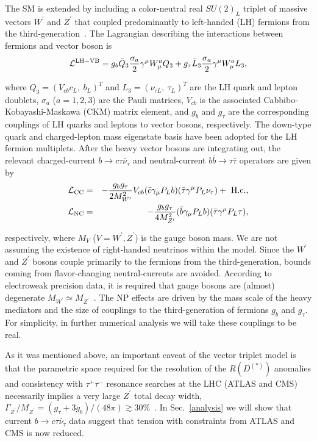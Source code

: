 \documentclass[reprint,showpacs,aps,prd,nofootinbib,superscriptaddress,longbibliography]{revtex4-1}
\begin{document}
The SM is extended by including a color-neutral real $SU(2)_L$ triplet of massive vectors $W^\prime$ and $Z^\prime$ that coupled predominantly to left-handed (LH) fermions from the third-generation~\cite{Greljo:2015mma,Faroughy:2016osc}. The Lagrangian describing the interactions between fermions and vector boson is~\cite{Greljo:2015mma,Faroughy:2016osc} 
\begin{equation}
 \mathcal{L}^{\rm LH-VB} =  g_b \bar{Q}_{3}\frac{\sigma_a}{2} \gamma^\mu W^a_\mu Q_{3} + g_\tau \bar{L}_{3} \frac{\sigma_a}{2} \gamma^\mu W^a_\mu L_{3},
 \end{equation}

\noindent where $Q_{3}= (V_{cb}c_L, \ b_L)^T$ and $L_{3}= (\nu_{\tau L}, \ \tau_L)^T$ are the LH quark and lepton doublets, $\sigma_a$ ($a=1,2,3$) are the Pauli matrices, $V_{cb}$ is the associated Cabbibo-Kobayashi-Maskawa (CKM) matrix element, and $g_b$ and $g_\tau$ are the corresponding couplings of LH quarks and leptons to vector bosons, respectively. The down-type quark and charged-lepton mass eigenstate basis have been adopted for the LH fermion multiplets. After the heavy vector bosons are integrating out, the relevant charged-current $b\to c\tau\bar{\nu}_\tau$ and neutral-current $b \bar{b}\to \tau\bar{\tau}$ operators are given by~\cite{Greljo:2015mma}
\begin{eqnarray}
 \mathcal{L}_{\rm CC} &=& -\frac{g_b g_\tau}{2 M^2_{W^\prime}} V_{cb} (\bar{c} \gamma_\mu P_L b) (\bar{\tau} \gamma^\mu P_L \nu_{\tau}) + \ {\rm H.c.},  \\
  \mathcal{L}_{\rm NC} &=& -\frac{g_b g_\tau}{4 M^2_{Z^\prime}} (\bar{b} \gamma_\mu P_L b) (\bar{\tau} \gamma^\mu P_L \tau), 
\end{eqnarray}

\noindent respectively, where $M_{V}$ ($V=W^\prime,Z^\prime$) is the gauge boson mass. We are not assuming the existence of right-handed neutrinos within the model. Since the $W^\prime$ and $Z^\prime$ bosons couple primarily to the fermions from the third-generation, bounds coming from flavor-changing neutral-currents are avoided. According to electroweak precision data, it is required that gauge bosons are (almost) degenerate $M_{W^\prime} \simeq M_{Z^\prime}$~\cite{Faroughy:2016osc}. The NP effects are driven by the mass scale of the heavy mediators and the size of couplings to the third-generation of fermions $g_b$ and $g_\tau$. For simplicity, in further numerical analysis we will take these couplings to be real.

As it was mentioned above, an important caveat of the vector triplet model is that the parametric space required for the resolution of the $R(D^{(\ast)})$ anomalies and consistency with $\tau^+\tau^-$ resonance searches at the LHC (ATLAS and CMS) necessarily implies a very large $Z^\prime$ total decay width, $\Gamma_{Z^\prime} / M_{Z^\prime} = (g_\tau + 3g_b)/(48\pi) \gtrsim 30 \%$~\cite{Greljo:2015mma,Faroughy:2016osc}.  In Sec.~\ref{analysis} we will show that current $b \to c \tau \bar{\nu}_{\tau}$ data suggest that tension with constraints from ATLAS and CMS is now reduced.
\end{document}
